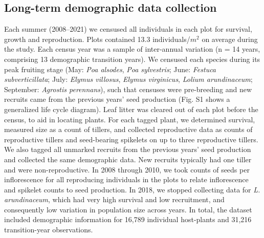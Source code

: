 \documentclass[lineno, sn-basic]{sn-jnl}%
\begin{document}
\subsection*{Long-term demographic data collection}
Each summer (2008--2021) we censused all individuals in each plot for survival, growth and reproduction.
Plots contained 13.3 individuals/$m^2$ on average during the study. 
Each census year was a sample of inter-annual variation (n = 14 years, comprising 13 demographic transition years).
We censused each species during its peak fruiting stage (May: \emph{Poa alsodes}, \emph{Poa sylvestris}; June: \emph{Festuca subverticillata}; July: \emph{Elymus villosus}, \emph{Elymus virginicus}, \emph{Lolium arundinaceum}; September: \emph{Agrostis perennans}), such that censuses were pre-breeding and new recruits came from the previous years' seed production (Fig. S1 shows a generalized life cycle diagram).
Leaf litter was cleared out of each plot before the census, to aid in locating plants.
For each tagged plant, we determined survival, measured size as a count of tillers, and collected reproductive data as counts of reproductive tillers and seed-bearing spikelets on up to three reproductive tillers. 
We also tagged all unmarked recruits from the previous years' seed production and collected the same demographic data. 
New recruits typically had one tiller and were non-reproductive. 
In 2008 through 2010, we took counts of seeds per inflorescence for all reproducing individuals in the plots to relate inflorescence and spikelet counts to seed production.
In 2018, we stopped collecting data for \emph{L. arundinaceum}, which had very high survival and low recruitment, and consequently low variation in population size across years.
In total, the dataset included demographic information for 16,789 individual host-plants and 31,216 transition-year observations.
\end{document}

